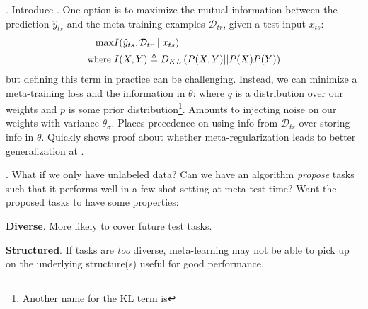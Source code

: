 \documentclass[11pt]{article}
\begin{document}
. Introduce . One option is to maximize the mutual information between the prediction $\hat{y}_{ts}$ and the meta-training examples $\mathcal{D}_{tr}$, given a test input $x_{ts}$:
\begin{align}
	\max &I(\hat{y}_{ts}, \mathcal{D}_{tr} \mid x_{ts}) \\
	{\small\text{where }} &I(X, Y) \triangleq D_{KL}\left(  P(X, Y)  ||  P(X)P(Y)  \right)
\end{align}
but defining this term in practice can be challenging. Instead, we can minimize a meta-training loss and the information in $\theta$:
where $q$ is a distribution over our weights and $p$ is some prior distribution\footnote{Another name for the KL term is }. Amounts to injecting noise on our weights with variance $\theta_{\sigma}$. Places precedence on using info from $\mathcal{D}_{tr}$ over storing info in $\theta$. Quickly shows proof about whether meta-regularization leads to better generalization at . 

\begin{compactitem}
	
\end{compactitem}

. What if we only have unlabeled data? Can we have an algorithm \textit{propose} tasks such that it performs well in a few-shot setting at meta-test time? Want the proposed tasks to have some properties:
\begin{compactitem}
	\item \textbf{Diverse}. More likely to cover future test tasks. 
	\item \textbf{Structured}. If tasks are \textit{too} diverse, meta-learning may not be able to pick up on the underlying structure(s) useful for good performance. 
\end{compactitem}
\end{document}
